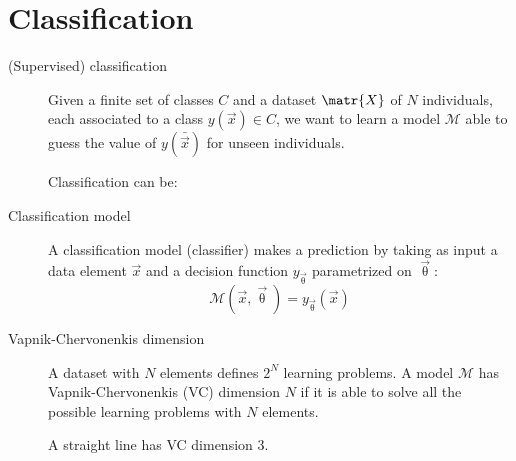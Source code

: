 \chapter{Classification}

\begin{description}
    \item[(Supervised) classification]  
        Given a finite set of classes $C$ and a dataset $\matr{X}$ of $N$ individuals, 
        each associated to a class $y(\vec{x}) \in C$,
        we want to learn a model $\mathcal{M}$ able to 
        guess the value of $y(\bar{\vec{x}})$ for unseen individuals.

        Classification can be:

    \item[Classification model] 
        A classification model (classifier) makes a prediction by taking as input 
        a data element $\vec{x}$ and a decision function $y_\vec{\uptheta}$ parametrized on $\vec{\uptheta}$:
        \[ \mathcal{M}(\vec{x}, \vec{\uptheta}) = y_\vec{\uptheta}(\vec{x}) \]

    \item[Vapnik-Chervonenkis dimension] 
        A dataset with $N$ elements defines $2^N$ learning problems.
        A model $\mathcal{M}$ has Vapnik-Chervonenkis (VC) dimension $N$ if 
        it is able to solve all the possible learning problems with $N$ elements.

        \begin{example}
            A straight line has VC dimension 3.
        \end{example}


\end{description}
